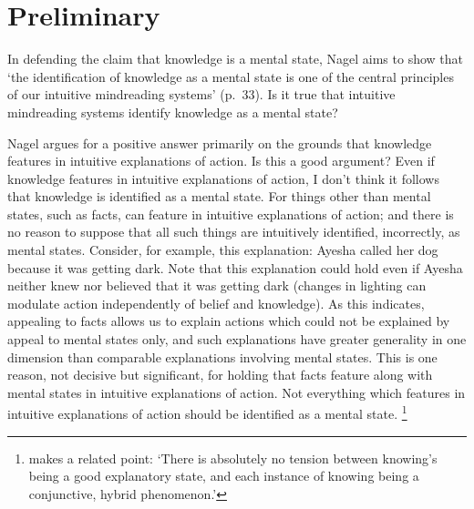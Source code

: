 \documentclass[11pt,a4paper]{extarticle}
\begin{document}
\setlength\footnotesep{1em}




\maketitle

\begin{abstract}
\noindent
***


\end{abstract}



\section{Preliminary}
In defending the claim that knowledge is a mental state, Nagel aims to show that `the identification of knowledge as a mental state is one of the central principles of our intuitive mindreading systems' (p.\ 33).
Is it true that intuitive mindreading systems identify knowledge as a mental state?

Nagel argues for a positive answer
primarily on the grounds that 
knowledge features in intuitive explanations of action.
Is this a good argument?
Even if knowledge features in intuitive explanations of action, 
I don't think it follows that
knowledge is identified as a mental state.
For things other than mental states, such as facts, can feature in intuitive explanations of action; and there is no reason to suppose that all such things are intuitively identified, incorrectly, as mental states.
Consider, for example, this explanation: Ayesha called her dog because it was getting dark.
Note that this explanation could hold even if Ayesha neither knew nor believed that it was getting dark (changes in lighting can modulate action independently of belief and knowledge).
As this indicates, appealing to facts allows us to explain actions which could not be explained by appeal to mental states only, and such explanations have greater generality in one dimension than comparable explanations involving mental states.
This is one reason, not decisive but significant, for holding that facts feature along with mental states in intuitive explanations of action.
Not everything which features in intuitive explanations of action should be identified as a mental state.%
\footnote{
\citet[p.\ 51]{fricker_2009} makes a related point: `There is absolutely no tension between knowing's being a good explanatory state, and each instance of knowing being a conjunctive, hybrid phenomenon.'
}
\end{document}
